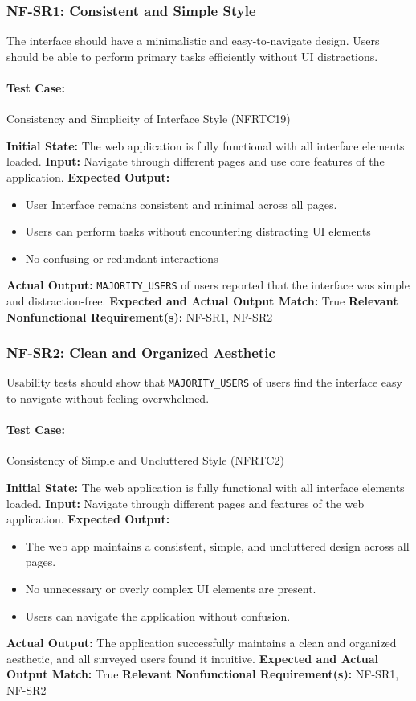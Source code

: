 \documentclass[12pt, titlepage]{article}
\begin{document}
\subsubsection{NF-SR1: Consistent and Simple Style}
The interface should have a minimalistic and easy-to-navigate design.  
Users should be able to perform primary tasks efficiently without UI distractions.

\paragraph{Test Case:} Consistency and Simplicity of Interface Style (NFRTC19)

\textbf{Initial State:} The web application is fully functional with all interface elements loaded.
\textbf{Input:} Navigate through different pages and use core features of the application.
\textbf{Expected Output:}
\begin{itemize}
    \item User Interface remains consistent and minimal across all pages.
    \item Users can perform tasks without encountering distracting UI elements
    \item No confusing or redundant interactions
\end{itemize}
\textbf{Actual Output:} \verb|MAJORITY_USERS| of users reported that the interface was simple and distraction-free.
\textbf{Expected and Actual Output Match:} True  
\textbf{Relevant Nonfunctional Requirement(s):} NF-SR1, NF-SR2  

\subsubsection{NF-SR2: Clean and Organized Aesthetic}
Usability tests should show that \verb|MAJORITY_USERS| of users find the interface easy to navigate without feeling overwhelmed.

\paragraph{Test Case:} Consistency of Simple and Uncluttered Style (NFRTC2)

\textbf{Initial State:} The web application is fully functional with all interface elements loaded.  
\textbf{Input:} Navigate through different pages and features of the web application.  
\textbf{Expected Output:}
\begin{itemize}
    \item The web app maintains a consistent, simple, and uncluttered design across all pages.
    \item No unnecessary or overly complex UI elements are present.
    \item Users can navigate the application without confusion.
\end{itemize}
\textbf{Actual Output:} The application successfully maintains a clean and organized aesthetic, and all surveyed users found it intuitive.  
\textbf{Expected and Actual Output Match:} True  
\textbf{Relevant Nonfunctional Requirement(s):} NF-SR1, NF-SR2  
\end{document}
